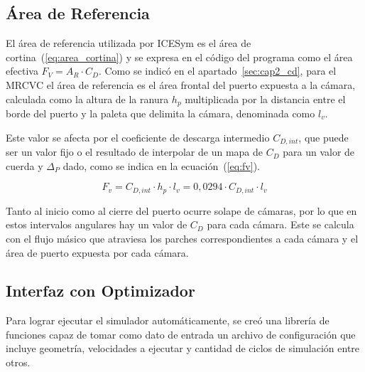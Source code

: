 
\subsection{Área de Referencia}
%
El área de referencia utilizada por ICESym es el área de
cortina~(\ref{eq:area_cortina}) y se expresa en el código del programa como el
área efectiva $F_{V}=A_{R}\cdot C_{D}$.
%
Como se indicó en el apartado~\ref{sec:cap2_cd}, para el  MRCVC el área de
referencia es el área frontal del puerto expuesta a la cámara, calculada como la
altura de la ranura $h_{p}$ multiplicada por la distancia entre el borde del
puerto y la paleta que delimita la cámara, denominada como $l_{v}$.

%
%
Este valor se afecta por el coeficiente de descarga intermedio $C_{D,int}$, que
puede ser un valor fijo o el resultado de interpolar de un mapa de $C_D$ para un
valor de cuerda y $\Delta_P$ dado, como se indica en la ecuación~(\ref{eq:fv}).

\begin{equation}\label{eq:fv}
    F_v = C_{D,int}\cdot h_{p}\cdot l_{v} = 0,0294\cdot C_{D,int}\cdot l_{v}
\end{equation}


Tanto al inicio como al cierre del puerto ocurre solape de cámaras, por lo que
en estos intervalos angulares hay un valor de $C_D$ para cada cámara.
%
Este se calcula con el flujo másico que atraviesa los parches correspondientes
a cada cámara y el área de puerto expuesta por cada cámara.

\subsection{Interfaz con Optimizador}
%
Para lograr ejecutar el simulador automáticamente, se creó una librería de
funciones capaz de tomar como dato de entrada un archivo de configuración que
incluye geometría, velocidades a ejecutar y cantidad de ciclos de simulación
entre otros.

